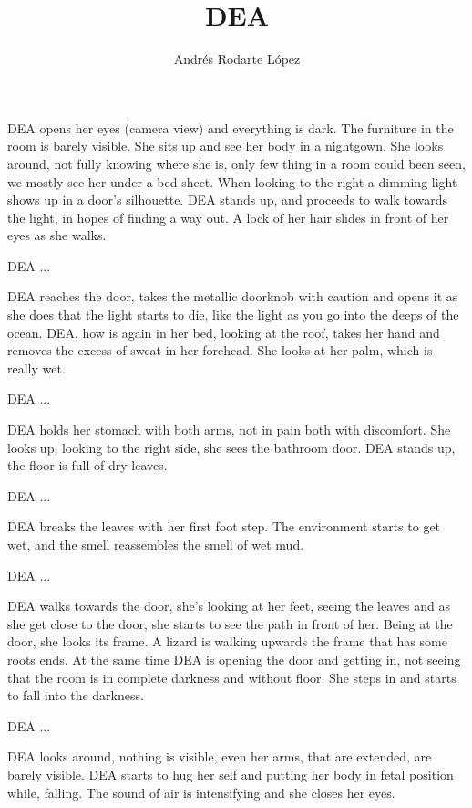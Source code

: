 \documentclass{screenplay}[2012/06/30]
\title{DEA}
\author{Andrés Rodarte López}
\begin{document}
\coverpage
{}
DEA opens her eyes (camera view) and everything is dark. 
The furniture in the room is barely visible.
She sits up and see her body in a nightgown. 
She looks around, not fully knowing where she is,
only few thing in a room could been seen, we mostly see her under a bed sheet. 
When looking to the right a dimming light shows up in a door's silhouette. 
DEA stands up, and proceeds to walk towards the light, in hopes of finding a
way out. A lock of her hair slides in front of her eyes as she walks.
\begin{dialogue}{DEA}
    ...
\end{dialogue}
DEA reaches the door, takes the metallic doorknob with caution and opens it as she 
does that the light starts to die, like the light as you go into the deeps of the ocean. 
\intercut
{}
DEA, how is again in her bed, looking at the roof, takes her hand and removes the excess of sweat in her forehead. 
She looks at her palm, which is really wet.
\begin{dialogue}{DEA}
    ...
\end{dialogue}
DEA holds her stomach with both arms, not in pain both with discomfort. She looks up,
looking to the right side, she sees the bathroom door. DEA stands up, the floor is full of 
dry leaves.
\begin{dialogue}{DEA}
    ...
\end{dialogue}
DEA breaks the leaves with her first foot step. 
The environment starts to get wet, and the 
smell reassembles the smell of wet mud.
\begin{dialogue}{DEA}
    ...
\end{dialogue}
DEA walks towards the door, she's looking at her feet, seeing the leaves and as she
get close to the door, she starts to see the path in front of her. 
Being at the door, she looks its frame.
A lizard is walking upwards the frame that has some roots ends. At the same time DEA is opening the door and 
getting in, not seeing that the room is in complete darkness and without floor. 
She steps in and starts to fall into the darkness.
\begin{dialogue}{DEA}
    ...
\end{dialogue}
DEA looks around, nothing is visible, even her arms, that are extended, are barely visible.
DEA starts to hug her self and putting her body in fetal position while, falling. The sound of air is
intensifying and she closes her eyes.
\end{document}
